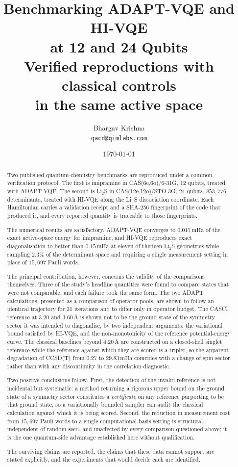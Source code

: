 \documentclass[11pt,a4paper]{article}
\title{\vspace{-1.1cm}\textbf{Benchmarking ADAPT-VQE and HI-VQE\\
at 12 and 24 Qubits}\\[0.4em]
\large Verified reproductions with classical controls\\
in the same active space}
\author{Bhargav Krishna\\\small\texttt{qacd@qimlabs.com}}
\date{\today}
\newcommand{\mHa}{\ensuremath{\,\mathrm{mHa}}}
\newcommand{\Ang}{\ensuremath{\,\text{\AA}}}
\begin{document}
\maketitle
\thispagestyle{fancy}

\begin{abstract}
\noindent
Two published quantum-chemistry benchmarks are reproduced under a common
verification protocol. The first is imipramine in CAS(6e,6o)/6-31G, 12 qubits,
treated with ADAPT-VQE. The second is Li$_2$S in CAS(12e,12o)/STO-3G, 24
qubits, $853{,}776$ determinants, treated with HI-VQE along the Li--S
dissociation coordinate. Each Hamiltonian carries a validation receipt and a
SHA-256 fingerprint of the code that produced it, and every reported quantity
is traceable to those fingerprints.

The numerical results are satisfactory. ADAPT-VQE converges to $0.017\mHa$ of
the exact active-space energy for imipramine, and HI-VQE reproduces exact
diagonalisation to better than $0.15\mHa$ at eleven of thirteen Li$_2$S
geometries while sampling $2.3\%$ of the determinant space and requiring a
single measurement setting in place of $15{,}697$ Pauli words.

The principal contribution, however, concerns the validity of the comparisons
themselves. Three of the study's headline quantities were found to compare
states that were not comparable, and each failure took the same form. The two
ADAPT calculations, presented as a comparison of operator pools, are shown to
follow an identical trajectory for 31 iterations and to differ only in operator
budget. The CASCI reference at $3.20$ and $3.60\Ang$ is shown not to be the
ground state of the symmetry sector it was intended to diagonalise, by two
independent arguments: the variational bound satisfied by HI-VQE, and the
non-monotonicity of the reference potential-energy curve. The classical
baselines beyond $4.20\Ang$ are constructed on a closed-shell singlet reference
while the reference against which they are scored is a triplet, so the apparent
degradation of CCSD(T) from $0.27$ to $29.83\mHa$ coincides with a change of
spin sector rather than with any discontinuity in the correlation diagnostic.

Two positive conclusions follow. First, the detection of the invalid reference
is not incidental but systematic: a method returning a rigorous upper bound on
the ground state of a symmetry sector constitutes a \emph{certificate} on any
reference purporting to be that ground state, so a variationally bounded
sampler can audit the classical calculation against which it is being scored.
Second, the reduction in measurement cost from $15{,}697$ Pauli words to a
single computational-basis setting is structural, independent of random seed,
and unaffected by every comparison questioned above; it is the one quantum-side
advantage established here without qualification.

The surviving claims are reported, the claims that these data cannot support
are stated explicitly, and the experiments that would decide each are
identified.
\end{abstract}
\end{document}
